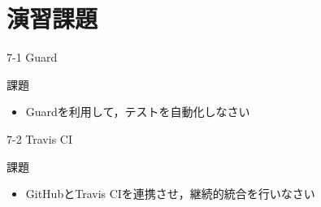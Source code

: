 \documentclass[t, aspectratio=169]{beamer}
\begin{document}
\section{演習課題}
\label{sec-7-3}
\begin{frame}[label=sec-7-3-1]{7-1 Guard}
\begin{block}{課題}
\begin{itemize}
\item Guardを利用して，テストを自動化しなさい
\end{itemize}
\end{block}
\end{frame}
\begin{frame}[label=sec-7-3-2]{7-2 Travis CI}
\begin{block}{課題}
\begin{itemize}
\item GitHubとTravis CIを連携させ，継続的統合を行いなさい
\end{itemize}
\end{block}
\end{frame}
\end{document}
